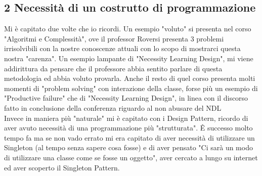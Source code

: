 \documentclass[a4paper]{article}
\begin{document}
\subsection{2 Necessità di un costrutto di programmazione}
Mi è capitato due volte che io ricordi. Un esempio "voluto" si presenta nel corso "Algoritmi e Complessità", ove il professor Roversi presenta 3 problemi irrisolvibili con la nostre conoscenze attuali con lo scopo di mostrarci questa nostra "carenza". Un esempio lampante di "Necessity Learning Design", mi viene addirittura da pensare che il professore abbia sentito parlare di questa metodologia ed abbia voluto provarla.
Anche il resto di quel corso presenta molti momenti di "problem solving" con interazione della classe, forse più un esempio di "Productive failure" che di "Necessity Learning Design", in linea con il discorso fatto in conclusione della conferenza riguardo al non abusare del NDL\\ 
Invece in maniera più "naturale" mi è capitato con i Design Pattern, ricordo di aver avuto necessità di una programmazione più "strutturata". Ê successo molto tempo fa ma se non vado errato mi era capitato di aver necessità di utilizzare un Singleton (al tempo senza sapere cosa fosse) e di aver pensato "Ci sarà un modo di utilizzare una classe come se fosse un oggetto", aver cercato a lungo su internet ed aver scoperto il Singleton Pattern.
\end{document}
